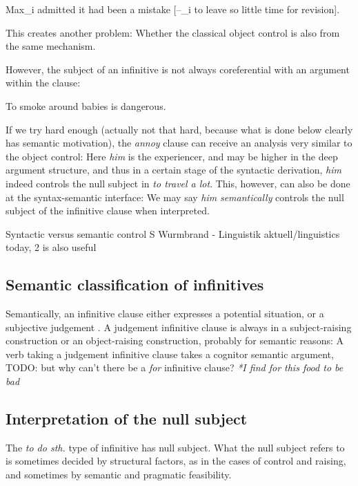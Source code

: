 \documentclass[UTF8, a4paper, oneside, scheme=plain, 12pt]{ctexbook}
\newcommand*{\citepage}[1]{p.~{#1}}
\newcommand{\form}[1]{\emph{#1}}
\begin{document}
\begin{exe}
    \ex\label{ex:complement.infinitive.semantic.1} Max_i admitted it had been a mistake [--_i to leave so little time for revision].
\end{exe}

This creates another problem: 
Whether the classical object control is also from the same mechanism.


However, the subject of an infinitive is not always coreferential with an argument within the clause:
\begin{exe}
    \ex To smoke around babies is dangerous.
\end{exe} 

If we try hard enough
(actually not that hard, because what is done below clearly has semantic motivation), 
the \form{annoy} clause can receive an analysis very similar to the object control:
Here \form{him} is the experiencer, 
and may be higher in the deep argument structure, 
and thus in a certain stage of the syntactic derivation,
\form{him} indeed controls the null subject in \form{to travel a lot}.
This, however, can also be done at the syntax-semantic interface: 
We may say \form{him} \emph{semantically} controls 
the null subject of the infinitive clause
when interpreted.

Syntactic versus semantic control
S Wurmbrand - Linguistik aktuell/linguistics today, 2 is also useful


\subsection{Semantic classification of infinitives}

Semantically, an infinitive clause either expresses a potential situation,
or a subjective judgement \citep[\citepage{245}]{dixon2005semantic}.
A judgement infinitive clause 
is always in a subject-raising construction or an object-raising construction,
probably for semantic reasons:
A verb taking a judgement infinitive clause 
takes a cognitor semantic argument,
TODO: but why can't there be a \form{for} infinitive clause? 
\form{*I find for this food to be bad}

\subsection{Interpretation of the null subject}

The \form{to do sth.} type of infinitive has null subject.
What the null subject refers to is sometimes decided by structural factors,
as in the cases of control and raising,
and sometimes by semantic and pragmatic feasibility.
\end{document}
